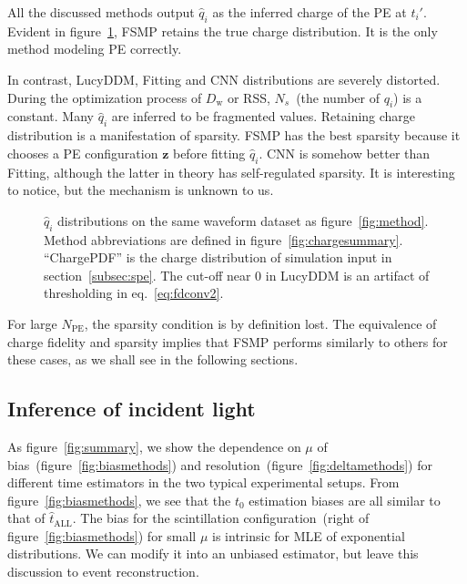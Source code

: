 All the discussed methods output $\hat{q}_i$ as the inferred charge of the PE at $t_i'$.  Evident in figure~\ref{fig:recchargehist}, FSMP retains the true charge distribution.  It is the only method modeling PE correctly.

In contrast, LucyDDM, Fitting and CNN distributions are severely distorted.  During the optimization process of $D_\mathrm{w}$ or RSS, $N_s$~(the number of $q_i$) is a constant. Many $\hat{q}_i$ are inferred to be fragmented values.  Retaining charge distribution is a manifestation of sparsity.  FSMP has the best sparsity because it chooses a PE configuration $\bm{z}$ before fitting $\hat{q}_i$.  CNN is somehow better than Fitting, although the latter in theory has self-regulated sparsity.  It is interesting to notice, but the mechanism is unknown to us.

\begin{figure}[H]
  \centering
  \resizebox{0.6\textwidth}{!}{}
  \caption{\label{fig:recchargehist} $\hat{q}_i$ distributions on the same waveform dataset as figure~\ref{fig:method}.  Method abbreviations are defined in figure~\ref{fig:chargesummary}. ``ChargePDF'' is the charge distribution of simulation input in section~\ref{subsec:spe}. The cut-off near 0 in LucyDDM is an artifact of thresholding in eq.~\eqref{eq:fdconv2}.}
\end{figure}

For large $N_\mathrm{PE}$, the sparsity condition is by definition lost.  The equivalence of charge fidelity and sparsity implies that FSMP performs similarly to others for these cases, as we shall see in the following sections.

\subsection{Inference of incident light}
\label{subsec:timeresolution}

As figure~\ref{fig:summary}, we show the dependence on $\mu$ of bias~(figure~\ref{fig:biasmethods}) and resolution~(figure~\ref{fig:deltamethods}) for different time estimators in the two typical experimental setups.  From figure~\ref{fig:biasmethods}, we see that the $t_0$ estimation biases are all similar to that of $\hat{t}_\mathrm{ALL}$. The bias for the scintillation configuration~(right of figure~\ref{fig:biasmethods}) for small $\mu$ is intrinsic for MLE of exponential distributions.  We can modify it into an unbiased estimator, but leave this discussion to event reconstruction.

